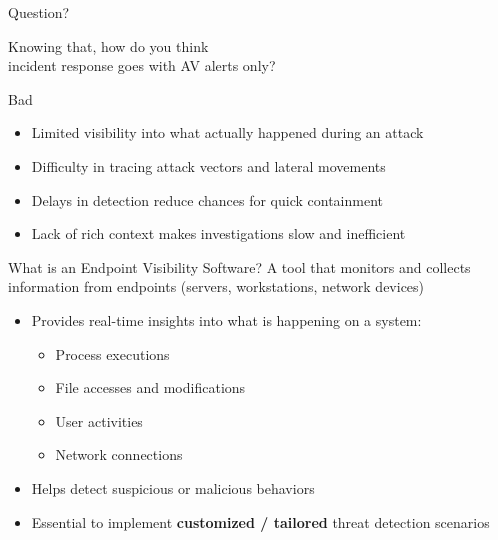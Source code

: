 \documentclass[12pt,aspectratio=169, colorlinks=true, linkcolor=circlBlue]{beamer}
\begin{document}
\begin{frame}{Question?}
	\begin{center}
		\Huge Knowing that, how do you think\\
		incident response goes with AV alerts only?
	\end{center}
\end{frame}

\begin{frame}{Bad}
	\begin{itemize}
		\item Limited visibility into what actually happened during an attack
		\item Difficulty in tracing attack vectors and lateral movements
		\item Delays in detection reduce chances for quick containment
		\item Lack of rich context makes investigations slow and inefficient
	\end{itemize}

\end{frame}

\begin{frame}{What is an Endpoint Visibility Software?}
	A tool that monitors and collects information from endpoints (servers, workstations, network devices)
	\begin{itemize}
		\item Provides real-time insights into what is happening on a system:
		      \begin{itemize}
			      \item Process executions
			      \item File accesses and modifications
			      \item User activities
			      \item Network connections
		      \end{itemize}
		\item Helps detect suspicious or malicious behaviors
		\item Essential to implement \textbf{customized / tailored} threat detection scenarios
	\end{itemize}
\end{frame}
\end{document}
